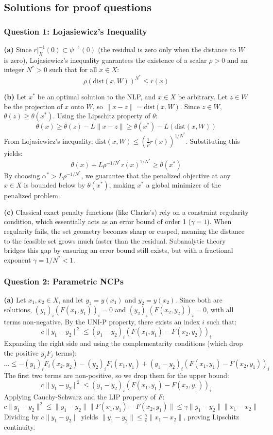 \documentclass[pdflatex,sn-mathphys-num]{sn-jnl}%
\theoremstyle{definition}
\begin{document}
\subsection{Solutions for proof questions}

\subsubsection{Question 1: Lojasiewicz's Inequality}
\textbf{(a)} Since $r|_X^{-1}(0) \subset \psi^{-1}(0)$ (the residual is zero only when the distance to $W$ is zero), Lojasiewicz's inequality guarantees the existence of a scalar $\rho > 0$ and an integer $N^* > 0$ such that for all $x \in X$:
$$ \rho (\text{dist}(x, W))^{N^*} \le r(x) $$

\textbf{(b)} Let $x^*$ be an optimal solution to the NLP, and $x \in X$ be arbitrary. Let $z \in W$ be the projection of $x$ onto $W$, so $\|x - z\| = \text{dist}(x,W)$. Since $z \in W$, $\theta(z) \ge \theta(x^*)$. Using the Lipschitz property of $\theta$:
$$ \theta(x) \ge \theta(z) - L\|x - z\| \ge \theta(x^*) - L(\text{dist}(x,W)) $$
From Lojasiewicz's inequality, $\text{dist}(x,W) \le (\frac{1}{\rho} r(x))^{1/N^*}$. Substituting this yields:
$$ \theta(x) + L \rho^{-1/N^*} r(x)^{1/N^*} \ge \theta(x^*) $$
By choosing $\alpha^* > L \rho^{-1/N^*}$, we guarantee that the penalized objective at any $x \in X$ is bounded below by $\theta(x^*)$, making $x^*$ a global minimizer of the penalized problem.

\textbf{(c)} Classical exact penalty functions (like Clarke's) rely on a constraint regularity condition, which essentially acts as an error bound of order 1 ($\gamma = 1$). When regularity fails, the set geometry becomes sharp or cusped, meaning the distance to the feasible set grows much faster than the residual. Subanalytic theory bridges this gap by ensuring an error bound still exists, but with a fractional exponent $\gamma = 1/N^* < 1$.

\subsubsection{Question 2: Parametric NCPs}
\textbf{(a)} Let $x_1, x_2 \in X$, and let $y_1 = y(x_1)$ and $y_2 = y(x_2)$. Since both are solutions, $(y_1)_i (F(x_1, y_1))_i = 0$ and $(y_2)_i (F(x_2, y_2))_i = 0$, with all terms non-negative.
By the UNI-P property, there exists an index $i$ such that:
$$ c\|y_1 - y_2\|^2 \le (y_1 - y_2)_i (F(x_1, y_1) - F(x_2, y_2))_i $$
Expanding the right side and using the complementarity conditions (which drop the positive $y_j F_j$ terms):
$$ \dots \le -(y_1)_i F_i(x_2, y_2) - (y_2)_i F_i(x_1, y_1) + (y_1 - y_2)_i (F(x_1, y_1) - F(x_2, y_1))_i $$
The first two terms are non-positive, so we drop them for the upper bound:
$$ c\|y_1 - y_2\|^2 \le (y_1 - y_2)_i (F(x_1, y_1) - F(x_2, y_1))_i $$
Applying Cauchy-Schwarz and the LIP property of $F$:
$$ c\|y_1 - y_2\|^2 \le \|y_1 - y_2\| \|F(x_1, y_1) - F(x_2, y_1)\| \le \gamma \|y_1 - y_2\| \|x_1 - x_2\| $$
Dividing by $c\|y_1 - y_2\|$ yields $\|y_1 - y_2\| \le \frac{\gamma}{c} \|x_1 - x_2\|$, proving Lipschitz continuity.
\end{document}
